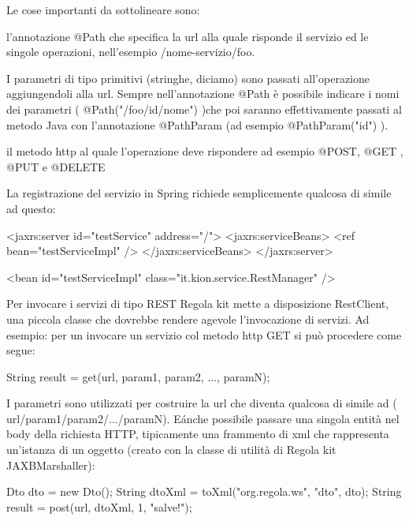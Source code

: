 Le cose importanti da sottolineare sono:
\begin{enumerate*}
\item l'annotazione @Path che specifica la url alla quale risponde il servizio ed le singole operazioni, nell'esempio /nome-servizio/foo. 
\item I parametri di tipo primitivi (stringhe, diciamo) sono passati all'operazione aggiungendoli alla url. Sempre nell'annotazione @Path è possibile indicare i nomi dei parametri ( @Path("/foo/{id}/{nome}") )che poi saranno effettivamente passati al metodo Java con l'annotazione @PathParam (ad esempio @PathParam("id") ).
\item il metodo http al quale l'operazione deve rispondere ad esempio @POST, @GET , @PUT e @DELETE
\end{enumerate*}

La registrazione del servizio in Spring richiede semplicemente qualcosa di simile ad questo:

\begin{xml}
  <jaxrs:server id="testService" address="/">
    <jaxrs:serviceBeans>
        <ref bean="testServiceImpl" />
      </jaxrs:serviceBeans>
  </jaxrs:server>

  <bean id="testServiceImpl" class="it.kion.service.RestManager" />
\end{xml}

Per invocare i servizi di tipo REST Regola kit mette a disposizione RestClient,  una piccola classe che dovrebbe rendere agevole l'invocazione di servizi. Ad esempio:
 per un invocare un servizio col metodo http GET si può procedere come segue:

\begin{java}
 String result = get(url, param1, param2, ..., paramN);
 
\end{java}

I parametri sono utilizzati per costruire la url che diventa qualcosa di simile ad ( url/param1/param2/.../paramN).
 E\' anche possibile passare una singola entità nel body della richiesta HTTP, tipicamente una frammento di xml che rappresenta un'istanza di un oggetto (creato con la classe di utilità di Regola kit  JAXBMarshaller):

\begin{java}
 Dto dto = new Dto();
 String dtoXml = toXml("org.regola.ws", "dto", dto);
 String result = post(url, dtoXml, 1, "salve!");
 
\end{java}
 
